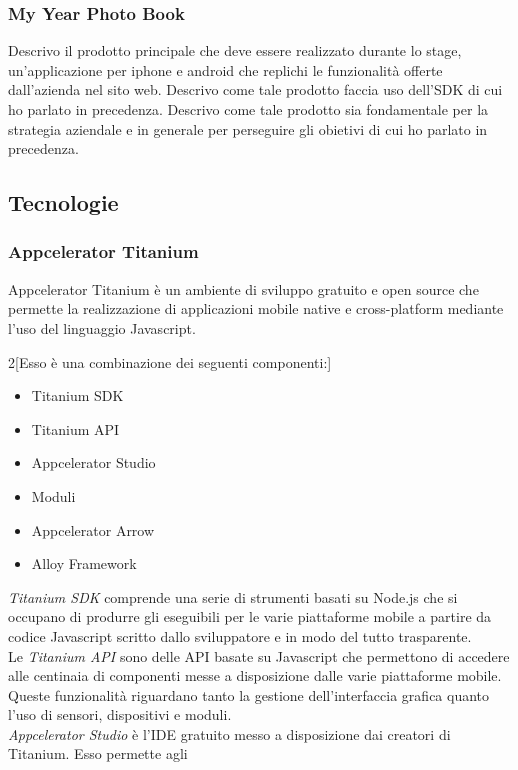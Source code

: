 			\subsubsection{My Year Photo Book}
				Descrivo il prodotto principale che deve essere realizzato durante lo stage, un'applicazione per iphone e android
				che replichi le funzionalità offerte dall'azienda nel sito web. Descrivo come tale prodotto faccia uso dell'SDK
				di cui ho parlato in precedenza. Descrivo come tale prodotto sia fondamentale per la strategia aziendale e in
				generale per perseguire gli obietivi di cui ho parlato in precedenza.
		\subsection{Tecnologie}
			\subsubsection{Appcelerator Titanium}
				Appcelerator Titanium è un ambiente di sviluppo gratuito e open source che permette la realizzazione di applicazioni
				mobile native e cross-platform mediante l'uso del linguaggio Javascript. 
				\begin{multicols}{2}[\noindent Esso è una combinazione dei seguenti componenti:]
					\begin{itemize}
						\item Titanium SDK
						\item Titanium API
						\item Appcelerator Studio
						\item Moduli
						\item Appcelerator Arrow
						\item Alloy Framework
					\end{itemize}
				\end{multicols}
				\emph{Titanium SDK} comprende una serie di strumenti basati su Node.js che si occupano di produrre gli eseguibili
				per le varie piattaforme mobile a partire da codice Javascript scritto dallo sviluppatore e in modo del tutto
				trasparente.\\
				Le \emph{Titanium API} sono delle API basate su Javascript che permettono di accedere alle centinaia di componenti
				messe a disposizione dalle varie piattaforme mobile. Queste funzionalità riguardano tanto la gestione
				dell'interfaccia grafica quanto l'uso di sensori, dispositivi e moduli.\\
				\emph{Appcelerator Studio} è l'IDE gratuito messo a disposizione dai creatori di Titanium. Esso permette agli
